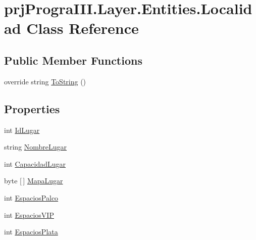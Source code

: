 \hypertarget{classprj_progra_i_i_i_1_1_layer_1_1_entities_1_1_localidad}{}\section{prj\+Progra\+I\+I\+I.\+Layer.\+Entities.\+Localidad Class Reference}
\label{classprj_progra_i_i_i_1_1_layer_1_1_entities_1_1_localidad}
\subsection*{Public Member Functions}
\begin{DoxyCompactItemize}
\item 
override string \hyperlink{classprj_progra_i_i_i_1_1_layer_1_1_entities_1_1_localidad_a4db71a3a17679f4e89717260d7d7b6cb}{To\+String} ()
\end{DoxyCompactItemize}
\subsection*{Properties}
\begin{DoxyCompactItemize}
\item 
int \hyperlink{classprj_progra_i_i_i_1_1_layer_1_1_entities_1_1_localidad_a7b37c8d6ac9bfdf9014ff06f2c16a6ed}{Id\+Lugar}
\item 
string \hyperlink{classprj_progra_i_i_i_1_1_layer_1_1_entities_1_1_localidad_a0ab4143e939704011d6a3d5fba1e61ec}{Nombre\+Lugar}
\item 
int \hyperlink{classprj_progra_i_i_i_1_1_layer_1_1_entities_1_1_localidad_a90569a32258dca6bb7fb133b6e7a247d}{Capacidad\+Lugar}
\item 
byte \mbox{[}$\,$\mbox{]} \hyperlink{classprj_progra_i_i_i_1_1_layer_1_1_entities_1_1_localidad_a24776f2be4b29d0dbb396daad22376be}{Mapa\+Lugar}
\item 
int \hyperlink{classprj_progra_i_i_i_1_1_layer_1_1_entities_1_1_localidad_af4279356a2676a714fed80e0a2105617}{Espacios\+Palco}
\item 
int \hyperlink{classprj_progra_i_i_i_1_1_layer_1_1_entities_1_1_localidad_a807e76002420aa7d0bd9b3d3e7b13e0d}{Espacios\+V\+IP}
\item 
int \hyperlink{classprj_progra_i_i_i_1_1_layer_1_1_entities_1_1_localidad_a23fff1e4c046da3a9841ca5bd8e8cb43}{Espacios\+Plata}
\end{DoxyCompactItemize}


